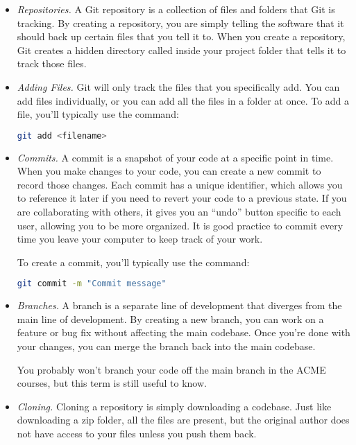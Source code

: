 \begin{itemize}
\item \emph{Repositories.}
A Git repository is a collection of files and folders that Git is tracking. 
By creating a repository, you are simply telling the software that it should back up certain files that you tell it to.
When you create a repository, Git creates a hidden directory called  inside your project folder that tells it to track those files.

\item \emph{Adding Files.}
Git will only track the files that you specifically add.
You can add files individually, or you can add all the files in a folder at once.
To add a file, you'll typically use the command:
\begin{lstlisting}[language=bash]
git add <filename>
\end{lstlisting}

\item \emph{Commits.}
A commit is a snapshot of your code at a specific point in time. 
When you make changes to your code, you can create a new commit to record those changes. 
Each commit has a unique identifier, which allows you to reference it later if you need to revert your code to a previous state.
If you are collaborating with others, it gives you an ``undo'' button specific to each user, allowing you to be more organized.
It is good practice to commit every time you leave your computer to keep track of your work.

To create a commit, you'll typically use the command:
\begin{lstlisting}[language=bash]
git commit -m "Commit message"
\end{lstlisting}

\item \emph{Branches.}
A branch is a separate line of development that diverges from the main line of development. 
By creating a new branch, you can work on a feature or bug fix without affecting the main codebase. 
Once you're done with your changes, you can merge the branch back into the main codebase.

You probably won't branch your code off the main branch in the ACME courses, but this term is still useful to know.

\item \emph{Cloning.}
Cloning a repository is simply downloading a codebase.
Just like downloading a zip folder, all the files are present, but the original author does not have access to your files unless you push them back.


\end{itemize}
